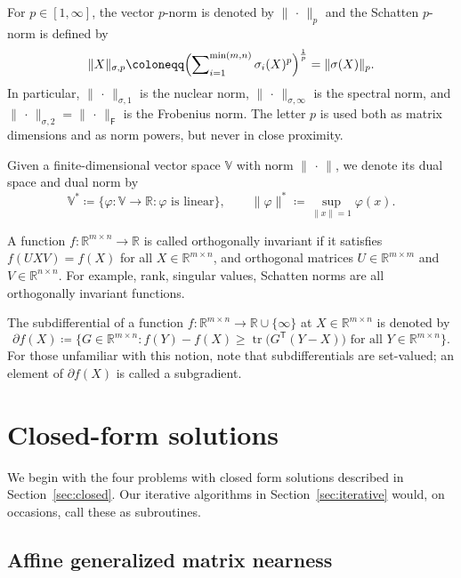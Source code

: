 \documentclass[11pt,reqno]{amsart}
\newcommand{\tp}{{\scriptscriptstyle\mathsf{T}}}
\newcommand{\st}{\sigma}
\newcommand{\F}{{\scriptscriptstyle\mathsf{F}}}
\DeclareMathOperator{\tr}{tr}
\theoremstyle{definition}
\numberwithin{equation}{section}
\newcommand{\R}{\mathbb{R}}
\begin{document}
For $p \in [1,\infty]$, the vector $p$-norm is denoted by $\lVert\,\cdot\,\rVert_{p}$ and the Schatten $p$-norm is defined by
\begin{equation}\label{eq:sch}
    \lVert X \rVert_{\st,p} \coloneqq \Bigl(\sum\nolimits_{i=1}^{\min(m,n)}\sigma_i(X)^p \Bigr)^{\frac{1}{p}} = \lVert \sigma(X) \rVert_p.
\end{equation}
In particular, $\lVert\,\cdot\,\rVert_{\st,1}$ is the nuclear norm, $\lVert\,\cdot\,\rVert_{\st,\infty}$ is the spectral norm, and $\lVert\,\cdot\,\rVert_{\st,2} = \lVert\,\cdot\,\rVert_\F$ is the Frobenius norm. The letter $p$ is used both as matrix dimensions and as norm powers, but never in close proximity.

Given a finite-dimensional vector space $\mathbb{V}$ with norm $\lVert\,\cdot\,\rVert$, we denote its dual space and dual norm by
\[
\mathbb{V}^* \coloneqq \{\varphi : \mathbb{V} \to \R : \varphi  \text{ is linear}\}, \qquad \lVert \varphi  \rVert^* \coloneqq \sup_{\lVert x \rVert = 1} \varphi (x).
\]

A function $f: \R^{m \times n} \to \R$ is called orthogonally invariant if it satisfies $f(UXV) = f(X)$ for all $X \in \R^{m \times n}$, and orthogonal matrices $U \in \R^{m \times m}$ and $V \in \R^{n \times n}$. For example, rank, singular values, Schatten norms are all orthogonally invariant functions. 

The subdifferential \cite{Clarke} of a function $f:\R^{m \times n} \to \R \cup \{\infty\}$ at $X \in \R^{m \times n}$ is denoted by
\[
\partial f(X) \coloneqq \bigl\{G\in \R^{m \times n} : f(Y)-f(X) \ge \tr\bigl(G^\tp (Y-X) \bigr) \text{ for all } Y \in \R^{m \times n}\bigr\}.
\]
For those unfamiliar with this notion, note that subdifferentials are set-valued; an element of $\partial f(X)$ is called a subgradient.


\section{Closed-form solutions}\label{sec:closed-form}

We begin with the four problems with closed form solutions described in Section~\ref{sec:closed}. Our iterative algorithms in Section~\ref{sec:iterative} would, on occasions, call these as subroutines.

\subsection{Affine generalized matrix nearness}\label{sec:affine}
\end{document}
